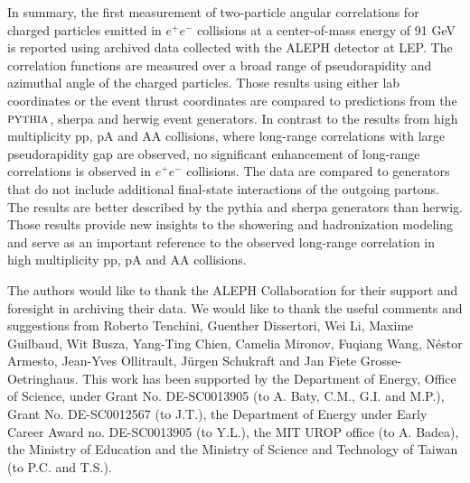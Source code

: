 \documentclass[aps,prl,twocolumn,superscriptaddress,groupedaddress]{revtex4}  %
\begin{document}
In summary, the first measurement of two-particle angular correlations for charged particles emitted in $e^+e^-$ collisions at a center-of-mass energy of 91 GeV is reported using archived data collected with the ALEPH detector at LEP. The correlation functions are measured over a broad range of pseudorapidity and azimuthal angle of the charged particles. Those results using either lab coordinates or the event thrust coordinates are compared to predictions from the $\textsc{pythia}$, {\sc sherpa} and {\sc herwig} event generators. In contrast to the results from high multiplicity pp, pA and AA collisions, where long-range correlations with large pseudorapidity gap are observed, no significant enhancement of long-range correlations is observed in $e^+e^-$ collisions. The data are compared to generators that do not include additional final-state interactions of the outgoing partons. The results are better described by the {\sc pythia} and {\sc sherpa} generators than {\sc herwig}.  Those results provide new insights to the showering and hadronization modeling and serve as an important reference to the observed long-range correlation in high multiplicity pp, pA and AA collisions.


The authors would like to thank the ALEPH Collaboration for their support and foresight in archiving their data. We would like to thank the useful comments and suggestions from Roberto Tenchini, Guenther Dissertori, Wei Li, Maxime Guilbaud, Wit Busza, Yang-Ting Chien, Camelia Mironov, Fuqiang Wang, N\'estor Armesto, Jean-Yves Ollitrault, J\"urgen Schukraft and Jan Fiete Grosse-Oetringhaus. This work has been supported by the Department of Energy, Office of Science, under Grant No. DE-SC0013905 (to A. Baty, C.M., G.I. and M.P.), Grant No. DE-SC0012567 (to J.T.), the Department of Energy under Early Career Award no. DE-SC0013905 (to Y.L.), the MIT UROP office (to A. Badea), the Ministry of Education and the Ministry of Science and Technology of Taiwan (to P.C. and T.S.).


\end{document}
